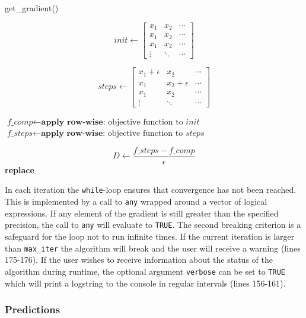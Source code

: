 \documentclass{article}
\begin{document}
\begin{algorithm}
\caption{get\_gradient()}\label{getGrad}
\begin{algorithmic}[1]
\State $$\textit{init} \gets \begin{bmatrix}
x_1 & x_2 & \cdots\\
x_1 & x_2 & \cdots\\
x_1 & x_2 & \cdots\\
\vdots & \ddots & \cdots
\end{bmatrix} $$

\State $$\textit{steps} \gets 
\begin{bmatrix}
x_1 + \epsilon & x_2 & \cdots\\
x_1 & x_2 + \epsilon & \cdots\\
x_1 & x_2 & \cdots\\
\vdots & \ddots & \cdots
\end{bmatrix}$$

\State $\textit{f\_comp} \gets \textbf{apply row-wise:} \text{ objective function to } \textit{init}$
\State $\textit{f\_steps} \gets \textbf{apply row-wise:} \text{ objective function to } \textit{steps}$
\EndProcedure

\State $$\textit{D} \gets \frac{f\_steps - f\_comp}{\epsilon}$$
 \textbf{replace} 
\EndIf
\EndProcedure
\end{algorithmic}
\end{algorithm}



In each iteration the \texttt{while}-loop ensures that convergence has not been reached. This is implemented by a call to \texttt{any} wrapped around a vector of logical expressions. If any element of the gradient is still greater than the specified precision, the call to \texttt{any} will evaluate to \texttt{TRUE}. The second breaking criterion is a safeguard for the loop not to run infinite times. If the current iteration is larger than \texttt{max\_iter} the algorithm will break and the user will receive a warning (lines 175-176). If the user wishes to receive information about the status of the algorithm during runtime, the optional argument \texttt{verbose} can be set to \texttt{TRUE} which will print a logstring to the console in regular intervals (lines 156-161).

\subsubsection{Predictions}
\end{document}
